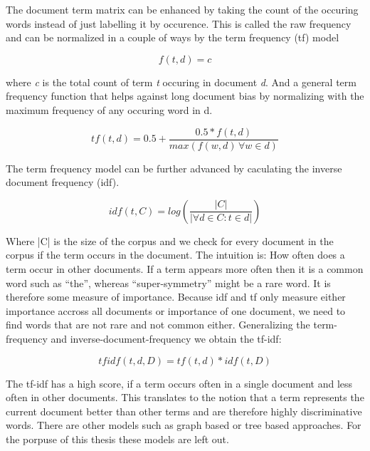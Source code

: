     The document term matrix can be enhanced by taking the count of the occuring words instead of just labelling it by occurence. This is called the raw frequency and can be normalized in a couple of ways by the term frequency (tf) model
     
      \begin{equation}
        f(t,d) = c
      \end{equation}

    where \emph{c} is the total count of term \emph{t} occuring in document \emph{d}.
    And a general term frequency function that helps against long document bias by normalizing with the maximum frequency of any occuring word in d.

    \begin{equation}
      tf(t,d) = 0.5 + \frac{0.5 * f(t,d)}{max(f(w,d)\, \forall w \in d)}
    \end{equation}

    The term frequency model can be further advanced by caculating the inverse document frequency (idf).

    \begin{equation}
      idf(t, C) = log(\frac{|C|}{|\forall d \in C : t \in d|})
    \end{equation}

    Where |C| is the size of the corpus and we check for every document in the corpus if the term occurs in the document. The intuition is: How often does a term occur in other documents. If a term appears more often then it is a common word such as ``the'', whereas ``super-symmetry'' might be a rare word. It is therefore some measure of importance. Because idf and tf only measure either importance accross all documents or importance of one document, we need to find words that are not rare and not common either. Generalizing the term-frequency and inverse-document-frequency we obtain the tf-idf:

    \begin{equation}
      tfidf(t, d, D) = tf(t, d) * idf(t, D)
    \end{equation}

    The tf-idf has a high score, if a term occurs often in a single document and less often in other documents. This translates to the notion that a term represents the current document better than other terms and are therefore highly discriminative words. There are other models such as graph based or tree based approaches. For the porpuse of this thesis these models are left out. \cite[chp. 6]{IRBook2008}\\

